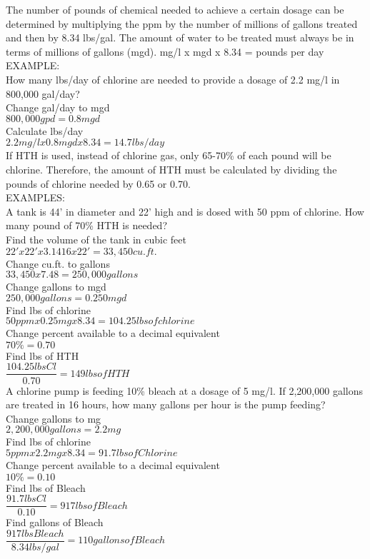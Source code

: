\documentclass{article}
\begin{document}
The number of pounds of chemical needed to achieve a certain dosage can be determined by multiplying the ppm by the number of millions of gallons treated and then by 8.34 lbs/gal. The amount of water to be treated must always be in terms of millions of gallons (mgd). mg/l x mgd x 8.34 = pounds per day\\
EXAMPLE:\\
How many lbs/day of chlorine are needed to provide a dosage of 2.2 mg/l in 800,000 gal/day?\\
Change gal/day to mgd\\
$800,000 gpd = 0.8 mgd$\\
Calculate lbs/day\\
$2.2 mg/l x 0.8 mgd x 8.34 =14.7 lbs/day$\\
If HTH is used, instead of chlorine gas, only 65-70\% of each pound will be chlorine. Therefore, the amount of HTH must be calculated by dividing the pounds of chlorine needed by 0.65 or 0.70.\\
EXAMPLES:\\
A tank is 44' in diameter and 22' high and is dosed with 50 ppm of chlorine. How many pound of 70\% HTH is needed?\\
Find the volume of the tank in cubic feet\\
$22' x 22' x 3.1416 x 22' = 33,450 cu.ft.$\\
Change cu.ft. to gallons\\
$33,450 x 7.48 = 250,000 gallons$\\
Change gallons to mgd\\
$250,000 gallons = 0.250 mgd$\\
Find lbs of chlorine\\
$50 ppm x 0.25 mg x 8.34 = 104.25 lbs of chlorine$\\
Change percent available to a decimal equivalent\\
$70\% = 0.70$\\
Find lbs of HTH\\
$\dfrac{104.25 lbs Cl}{0.70}= 149 lbs of HTH$\\
A chlorine pump is feeding 10\% bleach at a dosage of 5 mg/l. If 2,200,000 gallons are treated in 16 hours, how many gallons per hour is the pump feeding?\\
Change gallons to mg\\
$2,200,000 gallons = 2.2 mg$\\
Find lbs of chlorine\\
$5 ppm x 2.2 mg x 8.34 = 91.7 lbs of Chlorine$\\
Change percent available to a decimal equivalent\\
$10\% = 0.10$\\
Find lbs of Bleach\\
$\dfrac{91.7 lbs Cl}{0.10}= 917 lbs of Bleach$\\
Find gallons of Bleach\\
$\dfrac{917 lbs Bleach}{8.34 lbs/gal} = 110 gallons of Bleach$\\
\end{document}
